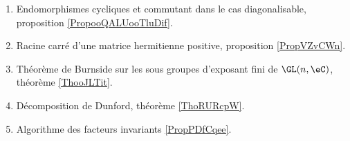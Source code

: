
    \begin{enumerate}
    \item Endomorphismes cycliques et commutant dans le cas diagonalisable, proposition \ref{PropooQALUooTluDif}.
    \item Racine carré d'une matrice hermitienne positive, proposition \ref{PropVZvCWn}.
    \item Théorème de Burnside sur les sous groupes d'exposant fini de \( \GL(n,\eC)\), théorème \ref{ThooJLTit}.
    \item Décomposition de Dunford, théorème \ref{ThoRURcpW}. 
    \item Algorithme des facteurs invariants \ref{PropPDfCqee}.
    \end{enumerate}

